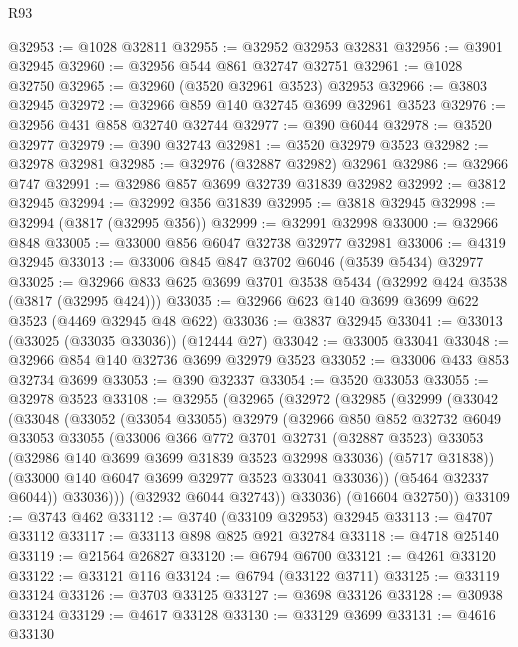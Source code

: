 \begin{lexlean}{R93}
\begin{coremodule}
@32953 := @1028 @32811
@32955 := @32952 @32953 @32831
@32956 := @3901 @32945
@32960 := @32956 @544 @861 @32747 @32751
@32961 := @1028 @32750
@32965 := @32960 (@3520 @32961 @3523) @32953
@32966 := @3803 @32945
@32972 := @32966 @859 @140 @32745 @3699 @32961 @3523
@32976 := @32956 @431 @858 @32740 @32744
@32977 := @390 @6044
@32978 := @3520 @32977
@32979 := @390 @32743
@32981 := @3520 @32979 @3523
@32982 := @32978 @32981
@32985 := @32976 (@32887 @32982) @32961
@32986 := @32966 @747
@32991 := @32986 @857 @3699 @32739 @31839 @32982
@32992 := @3812 @32945
@32994 := @32992 @356 @31839
@32995 := @3818 @32945
@32998 := @32994 (@3817 (@32995 @356))
@32999 := @32991 @32998
@33000 := @32966 @848
@33005 := @33000 @856 @6047 @32738 @32977 @32981
@33006 := @4319 @32945
@33013 := @33006 @845 @847 @3702 @6046 (@3539 @5434) @32977
@33025 := @32966 @833 @625 @3699 @3701 @3538 @5434 (@32992 @424 @3538 (@3817 (@32995 @424)))
@33035 := @32966 @623 @140 @3699 @3699 @622 @3523 (@4469 @32945 @48 @622)
@33036 := @3837 @32945
@33041 := @33013 (@33025 (@33035 @33036)) (@12444 @27)
@33042 := @33005 @33041
@33048 := @32966 @854 @140 @32736 @3699 @32979 @3523
@33052 := @33006 @433 @853 @32734 @3699
@33053 := @390 @32337
@33054 := @3520 @33053
@33055 := @32978 @3523
@33108 := @32955
    (@32965
      (@32972
        (@32985
          (@32999
            (@33042
              (@33048
                (@33052
                  (@33054 @33055)
                  @32979
                  (@32966
                    @850
                    @852
                    @32732
                    @6049
                    @33053
                    @33055
                    (@33006
                      @366
                      @772
                      @3701
                      @32731
                      (@32887 @3523)
                      @33053
                      (@32986 @140 @3699 @3699 @31839 @3523 @32998 @33036)
                      (@5717 @31838))
                    (@33000 @140 @6047 @3699 @32977 @3523 @33041 @33036))
                  (@5464 @32337 @6044))
                @33036)))
          (@32932 @6044 @32743))
        @33036)
      (@16604 @32750))
@33109 := @3743 @462
@33112 := @3740 (@33109 @32953) @32945
@33113 := @4707 @33112
@33117 := @33113 @898 @825 @921 @32784
@33118 := @4718 @25140
@33119 := @21564 @26827
@33120 := @6794 @6700
@33121 := @4261 @33120
@33122 := @33121 @116
@33124 := @6794 (@33122 @3711)
@33125 := @33119 @33124
@33126 := @3703 @33125
@33127 := @3698 @33126
@33128 := @30938 @33124
@33129 := @4617 @33128
@33130 := @33129 @3699
@33131 := @4616 @33130

\end{coremodule}
\end{lexlean}
